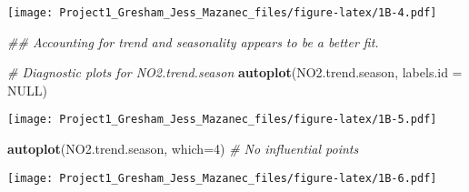 \documentclass[
]{article}
\newenvironment{Shaded}{\begin{snugshade}}{\end{snugshade}}
\newcommand{\CommentTok}[1]{\textcolor[rgb]{0.56,0.35,0.01}{\textit{#1}}}
\newcommand{\DataTypeTok}[1]{\textcolor[rgb]{0.13,0.29,0.53}{#1}}
\newcommand{\DecValTok}[1]{\textcolor[rgb]{0.00,0.00,0.81}{#1}}
\newcommand{\FloatTok}[1]{\textcolor[rgb]{0.00,0.00,0.81}{#1}}
\newcommand{\KeywordTok}[1]{\textcolor[rgb]{0.13,0.29,0.53}{\textbf{#1}}}
\newcommand{\NormalTok}[1]{#1}
\newcommand{\OperatorTok}[1]{\textcolor[rgb]{0.81,0.36,0.00}{\textbf{#1}}}
\newcommand{\OtherTok}[1]{\textcolor[rgb]{0.56,0.35,0.01}{#1}}
\newcommand{\StringTok}[1]{\textcolor[rgb]{0.31,0.60,0.02}{#1}}
\begin{document}
\begin{Shaded}
\end{Shaded}

\texttt{[image: Project1\_Gresham\_Jess\_Mazanec\_files/figure-latex/1B-4.pdf]}

\begin{Shaded}
\begin{Highlighting}[]
\CommentTok{## Accounting for trend and seasonality appears to be a better fit.}

\CommentTok{# Diagnostic plots for NO2.trend.season}
\KeywordTok{autoplot}\NormalTok{(NO2.trend.season, }\DataTypeTok{labels.id =} \OtherTok{NULL}\NormalTok{)}
\end{Highlighting}
\end{Shaded}

\texttt{[image: Project1\_Gresham\_Jess\_Mazanec\_files/figure-latex/1B-5.pdf]}

\begin{Shaded}
\begin{Highlighting}[]
\KeywordTok{autoplot}\NormalTok{(NO2.trend.season, }\DataTypeTok{which=}\DecValTok{4}\NormalTok{) }\CommentTok{# No influential points}
\end{Highlighting}
\end{Shaded}

\texttt{[image: Project1\_Gresham\_Jess\_Mazanec\_files/figure-latex/1B-6.pdf]}

\begin{Shaded}
\end{Shaded}
\end{document}
